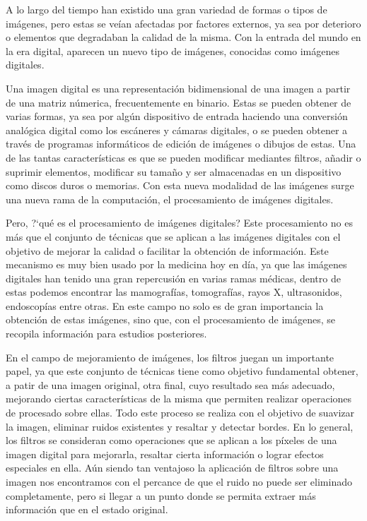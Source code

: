 \documentclass[a4paper,10pt,twocolumn]{article}
\begin{document}
A lo largo del tiempo han existido una gran variedad de formas o tipos de im\'agenes, pero estas se ve\'ian afectadas por factores externos, ya sea por deterioro o elementos que degradaban la calidad de la misma. Con la entrada del mundo en la era digital, aparecen un nuevo tipo de im\'agenes, conocidas como im\'agenes digitales.

Una imagen digital es una representaci\'on bidimensional de una imagen a partir de una matriz n\'umerica, frecuentemente en binario. Estas se pueden obtener de varias formas, ya sea por alg\'un dispositivo de entrada haciendo una conversi\'on anal\'ogica digital como los esc\'aneres y c\'amaras digitales, o se pueden obtener a trav\'es de programas inform\'aticos de edici\'on de im\'agenes o dibujos de estas. Una de las tantas caracter\'isticas es que se pueden modificar mediantes filtros, a\~nadir o suprimir elementos, modificar su tama\~no y ser almacenadas en un dispositivo como discos duros o memorias. Con esta nueva modalidad de las im\'agenes surge una nueva rama de la computaci\'on, el procesamiento de im\'agenes digitales.

Pero, ?`qu\'e es el procesamiento de im\'agenes digitales? Este procesamiento no es m\'as que el conjunto de t\'ecnicas que se aplican a las im\'agenes digitales con el objetivo de mejorar la calidad o facilitar la obtenci\'on de informaci\'on. Este mecanismo es muy bien usado por la medicina hoy en d\'ia, ya que las im\'agenes digitales han tenido una gran repercusi\'on en varias ramas m\'edicas, dentro de estas podemos encontrar las mamograf\'ias, tomograf\'ias, rayos X, ultrasonidos, endoscop\'ias entre otras. En este campo no solo es de gran importancia la obtenci\'on de estas im\'agenes, sino que, con el procesamiento de im\'agenes, se recopila informaci\'on para estudios posteriores.

En el campo de mejoramiento de im\'agenes, los filtros juegan un importante papel, ya que este conjunto de t\'ecnicas tiene como objetivo fundamental obtener, a patir de una imagen original, otra final, cuyo resultado sea m\'as adecuado, mejorando ciertas caracter\'isticas de la misma que permiten realizar operaciones de procesado sobre ellas. Todo este proceso se realiza con el objetivo de suavizar la imagen, eliminar ruidos existentes y resaltar y detectar bordes. En lo general, los filtros se consideran como operaciones que se aplican a los p\'ixeles de una imagen digital para mejorarla, resaltar cierta informaci\'on o lograr efectos especiales en ella. A\'un siendo tan ventajoso la aplicaci\'on de filtros sobre una imagen nos encontramos con el percance de que el ruido no puede ser eliminado completamente, pero si llegar a un punto donde se permita extraer m\'as informaci\'on que en el estado original. 
\end{document}
